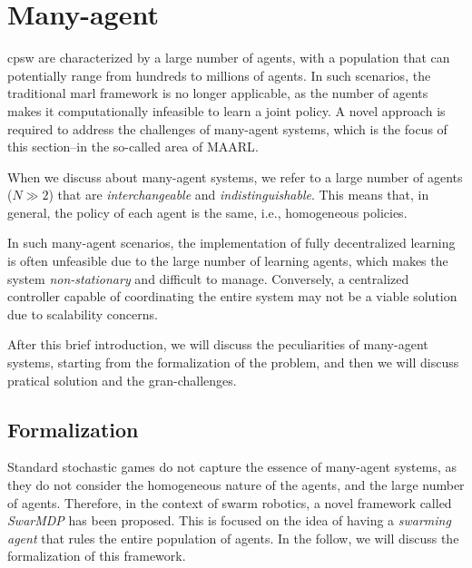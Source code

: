 \section{Many-agent}
\ac{cpsw} are characterized by a large number of agents, 
 with a population that can potentially range from hundreds to millions of agents.
%
In such scenarios, 
 the traditional \ac{marl} framework is no longer applicable, 
 as the number of agents makes it computationally infeasible to learn a joint policy.
%
A novel approach is required to address the challenges of many-agent systems, 
 which is the focus of this section--in the so-called area of \ac{MAARL}.

When we discuss about many-agent systems, 
 we refer to a large number of agents ($N \gg 2$) that are \emph{interchangeable} and \emph{indistinguishable}.%
%
This means that, in general, the policy of each agent is the same, i.e., homogeneous policies.

In such many-agent scenarios, 
 the implementation of fully decentralized learning is often unfeasible due to the large number of learning agents, 
 which makes the system \emph{non-stationary} and difficult to manage. 
%
Conversely, a centralized controller capable of coordinating 
 the entire system may not be a viable solution due to scalability concerns. 
%

After this brief introduction, 
 we will discuss the peculiarities of many-agent systems,
 starting from the formalization of the problem,
  and then we will discuss pratical solution and the gran-challenges.
\subsection{Formalization}
Standard stochastic games do not capture the essence of many-agent systems, 
 as they do not consider the homogeneous nature of the agents, and the large number of agents.
Therefore, in the context of swarm robotics, 
 a novel framework called \emph{SwarMDP} has been proposed.
 This is focused on the idea of having a \emph{swarming agent} that rules the entire population of agents.
 In the follow, we will discuss the formalization of this framework.
